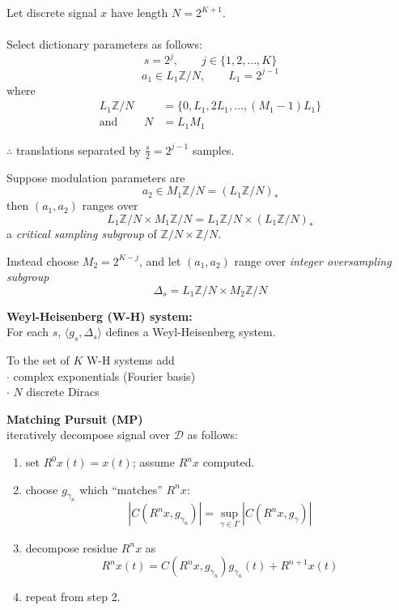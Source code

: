 \documentclass{slides}
\def\Z{\mathbb{Z}}    %
\begin{document}
\begin{slide}%
\begin{center}{\tt \underline{}}\end{center}
Let discrete signal $x$ have length $N = 2^{K+1}$. \\
\\
Select dictionary parameters as follows:
\[
s = 2^j, \qquad j \in \{1,2,\ldots,K\}
\]
\[
a_1 \in L_1\Z/N, \qquad L_1 = 2^{j-1}
\]
where
\begin{align*}
L_1\Z/N &= \{0, L_1, 2L_1, \ldots, (M_1-1)L_1\}\\
\text{and }\qquad N &= L_1M_1
\end{align*}

$\therefore$ translations separated by $\frac{s}{2} = 2^{j-1}$ samples.
\end{slide}
\begin{slide}
Suppose modulation parameters are
\[
a_2 \in M_1\Z/N = (L_1\Z/N)_*
\]
then $(a_1,a_2)$ ranges over
\[
L_1\Z/N \times M_1\Z/N = L_1\Z/N \times (L_1\Z/N)_*
\]
a \emph{critical sampling subgroup} of $\Z/N \times \Z/N$.  

Instead choose $M_2= 2^{K-j}$, and let $(a_1,a_2)$ range over
\emph{integer oversampling subgroup}
\[
\Delta_s = L_1\Z/N \times M_2\Z/N
\]
\end{slide}
\begin{slide}
{\bf Weyl-Heisenberg (W-H) system:}\\
For each $s$, $\langle g_s,\Delta_s \rangle$ defines a Weyl-Heisenberg system.

To the set of $K$ W-H systems add\\
$\cdot$ complex exponentials (Fourier basis)\\
$\cdot$ $N$ discrete Diracs
\end{slide}
\begin{slide}
{\bf Matching Pursuit (MP)}\\
iteratively decompose signal over $\mathcal{D}$ as follows:
\begin{enumerate}
\item set $R^0x(t)=x(t)$; assume $R^nx$ computed.
\item choose $g_{\gamma_n}$ which ``matches'' $R^nx$:
\[
|C(R^nx,g_{\gamma_n})| = \sup_{\gamma \in \Gamma} |C(R^nx,g_\gamma)|
\]
\item decompose residue $R^nx$ as
\[
R^nx(t) = C(R^nx,g_{\gamma_n})g_{\gamma_n}(t) + R^{n+1}x(t)
\]
\item repeat from step 2.
\end{enumerate}
\end{slide}
\end{document}
